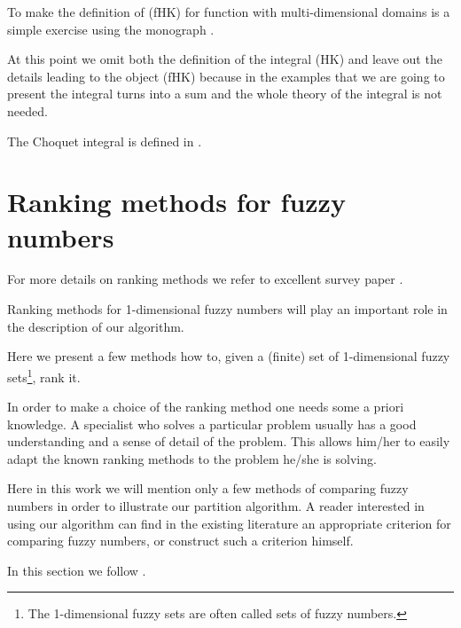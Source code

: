 \documentclass[leqno,12pt]{amsart}
\theoremstyle{remark}
\theoremstyle{remark}
\theoremstyle{remark}
\theoremstyle{definition}
\numberwithin{equation}{section}
\begin{document}
\par
To make the definition of (fHK) for function with multi-dimensional domains is a simple exercise using the monograph \cite{HK}.
\par
At this point we omit both the definition of the integral (HK) and leave out the details leading to the object (fHK) because in the examples that we are going to present the integral turns into a sum and the whole theory of the integral is not needed.

The Choquet integral is defined in \cite{Choquet}.
\section{Ranking methods for fuzzy numbers}
For more details on ranking methods we refer to excellent survey paper \cite{Brunelli}.
\par
Ranking methods for 1-dimensional fuzzy numbers will play an important role in the description of our algorithm.

Here we present a few methods how to, given a (finite) set of 1-di\-men\-sio\-nal fuzzy sets\footnote{The 1-dimensional fuzzy sets are often called sets of fuzzy numbers.}, rank it.
\par
In order to make a choice of the ranking method one needs some a priori knowledge. A specialist who solves a particular problem usually has a good understanding and a sense of detail of the problem. This allows him/her to easily adapt the known ranking methods to the problem he/she is solving.
\par
Here in this work we will mention only a few methods of comparing fuzzy numbers in order to illustrate our partition algorithm. A reader interested in using our algorithm  can find in the existing literature an appropriate criterion for comparing fuzzy numbers, or construct such a criterion himself.
\par
In this section we follow \cite{Brunelli}.
\end{document}
